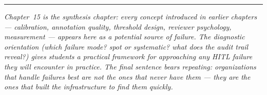 \bigskip
\begin{center}
\rule{0.5\textwidth}{0.4pt}
\end{center}
\bigskip

\noindent\textit{Chapter~15 is the synthesis chapter: every concept introduced in earlier chapters --- calibration, annotation quality, threshold design, reviewer psychology, measurement --- appears here as a potential source of failure. The diagnostic orientation (which failure mode? spot or systematic? what does the audit trail reveal?) gives students a practical framework for approaching any HITL failure they will encounter in practice. The final sentence bears repeating: organizations that handle failures best are not the ones that never have them --- they are the ones that built the infrastructure to find them quickly.}
